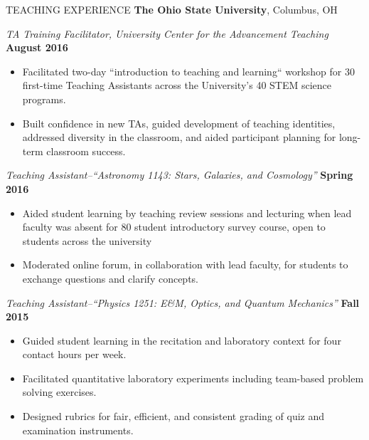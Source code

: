 \documentclass{resume} %
\begin{document}
\begin{rSection}{TEACHING EXPERIENCE}
{\bf The Ohio State University}, Columbus, OH 

{\em TA Training Facilitator, University Center for the Advancement Teaching} \hfill {\bf August 2016}
\begin{itemize}
\vspace*{-.05in}
\item Facilitated two-day ``introduction to teaching and learning`` workshop for 30 first-time Teaching Assistants across the University's 40 STEM science programs.
\item Built confidence in new TAs, guided development of teaching identities, addressed diversity in the classroom, and aided participant planning for long-term classroom success.
\end{itemize}

{\em Teaching Assistant--``Astronomy 1143: Stars, Galaxies, and Cosmology''} \hfill {\bf Spring 2016}
\begin{itemize}
\vspace*{-.05in}
\item Aided student learning by teaching review sessions and lecturing when lead faculty was absent for 80 student introductory survey course, open to students across the university
\item Moderated online forum, in collaboration with lead faculty, for students to exchange questions and clarify concepts.
\end{itemize}
{\em Teaching Assistant--``Physics 1251: E\&M, Optics, and Quantum Mechanics''} \hfill {\bf Fall 2015}
\begin{itemize}
\vspace*{-.05in}
\item Guided student learning in the recitation and laboratory context for four contact hours per week.
\item Facilitated quantitative laboratory experiments including team-based problem solving exercises.
\item Designed rubrics for fair, efficient, and consistent grading of quiz and examination instruments.
\end{itemize}
\end{rSection}
\end{document}
